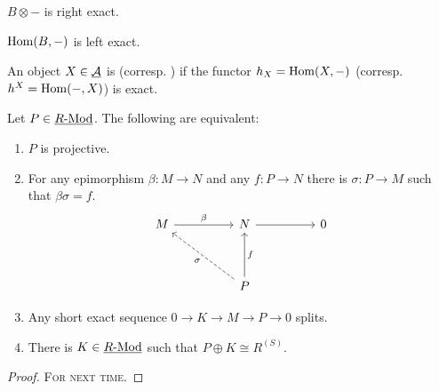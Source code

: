 \begin{examples*}
	\item \( B \otimes - \) is right exact.
	\item \( \operatorname{Hom}(B, -) \) is left exact.
\end{examples*}

\begin{definition*}
	An object \( X \in \underline{\mathcal{A}} \) is  (corresp. ) if the functor \( h_X = \operatorname{Hom}(X, -) \) (corresp. \( h^X = \operatorname{Hom}(-, X) \)) is exact.
\end{definition*}

\newpage

\begin{theorem*}
	Let \( P \in \underline{R\text{-}\mathrm{Mod}} \). The following are equivalent:
	\begin{enumerate}
		\item \( P \) is projective.
		\item For any epimorphism \( \beta: M \to N \) and any \( f: P \to N \) there is \( \sigma: P \to M \) such that \( \beta \sigma = f \).
			\[
				\begin{tikzcd}
					M && N && 0 \\
					\\
					&& P
					\arrow["\beta", from=1-1, to=1-3]
					\arrow[from=1-3, to=1-5]
					\arrow["\sigma", dashed, from=3-3, to=1-1]
					\arrow["f"', from=3-3, to=1-3]
				\end{tikzcd}
			\]
		\item Any short exact sequence \( 0 \to K \to M \to P \to 0 \) splits.
		\item There is \( K \in \underline{R\text{-}\mathrm{Mod}} \) such that \( P \oplus K \cong R^{(S)} \).
	\end{enumerate}
\end{theorem*}
\begin{proof}
	\textsc{For next time}.
\end{proof}